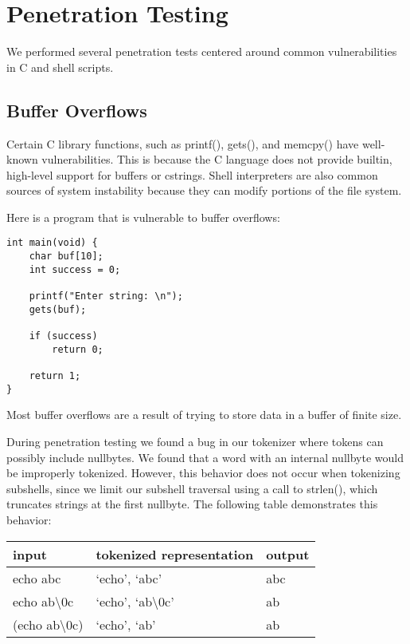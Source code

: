 \documentclass[12pt]{article}
\begin{document}
\section{Penetration Testing}
We performed several penetration tests centered around common vulnerabilities in C and shell scripts.

\subsection{Buffer Overflows}
 Certain C library functions, such as printf(), gets(), and memcpy() have well-known vulnerabilities\cite{formatstring,smashingthestack}. This is because the C language does not provide builtin, high-level support for buffers or cstrings. Shell interpreters are also common sources of system instability because they can modify portions of the file system.

Here is a program that is vulnerable to buffer overflows:
\begin{lstlisting}[frame=single]
int main(void) {
	char buf[10];
	int success = 0;

	printf("Enter string: \n");
	gets(buf);

	if (success)
		return 0;

	return 1;
}
\end{lstlisting}

Most buffer overflows are a result of trying to store data in a buffer of finite size.

During penetration testing we found a bug in our tokenizer where tokens can possibly include nullbytes. We found that a word with an internal nullbyte would be improperly tokenized. However, this behavior does not occur when tokenizing subshells, since we limit our subshell traversal using a call to strlen(), which truncates strings at the first nullbyte. The following table demonstrates this behavior: \\

\begin{tabular}{ | l | l | l | }
	\hline
		input & tokenized representation & output \\ \hline
		echo abc & `echo', `abc' & abc \\ \hline
		echo ab\textbackslash0c & `echo', `ab\textbackslash0c' & ab \\ \hline
		(echo ab\textbackslash0c) & `echo', `ab' & ab \\
	\hline
\end{tabular}\\
\end{document}
